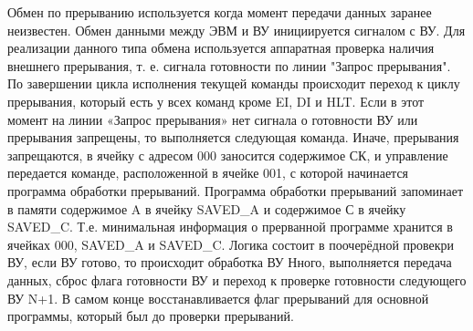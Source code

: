 \documentclass{article}
\begin{document}
Обмен по прерыванию используется когда момент передачи данных заранее неизвестен. Обмен данными между ЭВМ и ВУ инициируется сигналом с ВУ.
 Для реализации данного типа обмена используется аппаратная проверка наличия внешнего прерывания, т. е. сигнала готовности по линии "Запрос прерывания". 
 По завершении цикла исполнения текущей команды происходит переход к циклу прерывания, который есть у всех команд кроме EI, DI и HLT. 
 Если в этот момент на линии «Запрос прерывания» нет сигнала о готовности ВУ или прерывания запрещены, то выполняется следующая команда. Иначе, прерывания запрещаются, 
 в ячейку с адресом 000 заносится содержимое СК, и управление передается команде, расположенной в ячейке 001, с которой начинается программа обработки прерываний. 
 Программа обработки прерываний запоминает в памяти содержимое A в ячейку SAVED\_A и содержимое С в ячейку SAVED\_C. 
 Т.е. минимальная информация о прерванной программе хранится в ячейках 000, SAVED\_A и SAVED\_C. 
 Логика состоит в поочерёдной провекри ВУ, если ВУ готово, то происходит обработка ВУ Нного, выполняется передача данных, сброс флага готовности ВУ и переход к проверке готовности следующего ВУ N+1.
В самом конце восстанавливается флаг прерываний для основной программы, который был до проверки прерываний.
\end{document}
